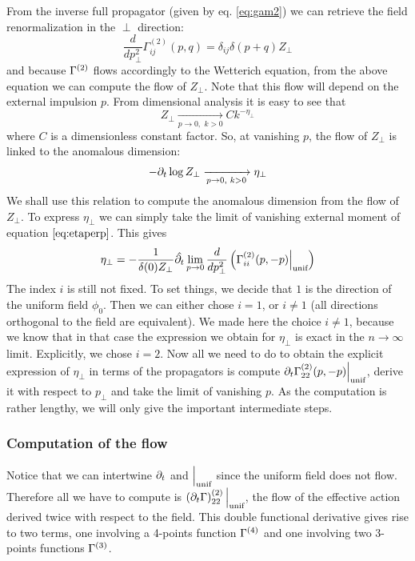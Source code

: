 From the inverse full propagator (given by eq. \eqref{eq:gam2}) we can retrieve the field renormalization in the $\perp$ direction:
\begin{equation}
\label{eq:etaperp}
\frac{d}{dp_\perp^2} \Gamma^{(2)}_{ij}(p,q) = \delta_{ij} \delta(p+q) Z_\perp
\end{equation}
and because $\Gamma^{(2)}$ flows accordingly to the Wetterich equation, from the above equation we can compute the flow of $Z_\perp$. 
Note that this flow will depend on the external impulsion $p$. From dimensional analysis it is easy to see that
\begin{equation}
 Z_\perp \xrightarrow[p \rightarrow 0,\text{~} k>0]{} C k^{-\eta_\perp}
 \end{equation} 
 where $C$ is a dimensionless constant factor. So, at vanishing $p$, the flow of $Z_\perp$ is linked to the anomalous dimension:
 \begin{equation}
 - \partial_{t} \log Z_\perp \xrightarrow[p \rightarrow 0,\text{~} k>0]{} \eta_\perp
 \end{equation}
 We shall use this relation to compute the anomalous dimension from the flow of $Z_\perp$.
 To express $\eta_\perp$ we can simply take the limit of vanishing external moment of equation $\eqref{eq:etaperp}$. This gives
\begin{equation}
\eta_\perp = -\frac{1}{\delta(0) Z_\perp} \hat{\partial_{t}} \lim_{p \rightarrow 0} \frac{d}{dp_\perp^2} \left( \Gamma^{(2)}_{ii}(p,-p)  \Big|_{\text{unif}}  \right)
\end{equation}
The index $i$ is still not fixed. To set things, we decide that $1$ is the direction of the uniform field $\phi_0$. Then we can either chose $i=1$, or $i \neq 1$ (all directions orthogonal to the field are equivalent). We made here the choice $i \neq 1$, because we know that in that case the expression we obtain for $\eta_\perp$ is exact in the $n \rightarrow \infty$ limit. Explicitly, we chose $i=2$.
Now all we need to do to obtain the explicit expression of $\eta_\perp$ in terms of the propagators is compute $\partial_{t} \Gamma^{(2)}_{22}(p,-p)  \Big|_{\text{unif}} $, derive it with respect to $p_\perp$ and take the limit of vanishing $p$. As the computation is rather lengthy, we will only give the important intermediate steps.

\subsubsection{Computation of the flow}
\label{sec:etaperp}
Notice that we can intertwine $\partial_{t}$ and $ \Big|_{\text{unif}} $ since the uniform field does not flow. 
Therefore all we have to compute is $ \left(\partial_{t} \Gamma\right)^{(2)}_{22}  \Big|_{\text{unif}} $, the flow of the effective action derived twice with respect to the field. This double functional derivative gives rise to two terms, one involving a 4-points function $\Gamma^{(4)}$ and one involving two 3-points functions $\Gamma^{(3)}$.


